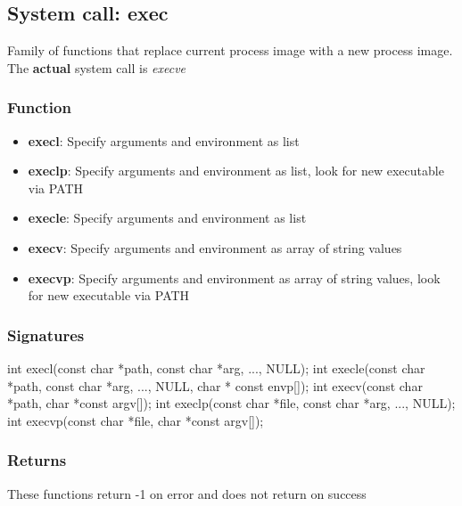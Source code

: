 \documentclass{report}
\begin{document}
        \bigbreak \noindent 
        \subsection{System call: exec}
        \bigbreak \noindent 
        \begin{concept}
            Family of functions that replace current process image with a new process image.
            \bigbreak \noindent 
            The \textbf{actual} system call is \textit{execve}
        \end{concept}

        \bigbreak \noindent 
        \subsubsection{Function}
        \begin{itemize}
            \item \textbf{execl}: Specify arguments and environment as list
            \item \textbf{execlp}: Specify arguments and environment as list, look for new executable via PATH
            \item \textbf{execle}: Specify arguments and environment as list
            \item \textbf{execv}: Specify arguments and environment as array of string values
            \item \textbf{execvp}: Specify arguments and environment as array of string values, look for new executable via PATH
        \end{itemize}


        \bigbreak \noindent 
        \subsubsection{Signatures}
        \bigbreak \noindent 
        \begin{cppcode}
            int execl(const char *path, const char *arg, ..., NULL);
            int execle(const char *path, const char *arg, ..., NULL, char * const envp[]);
            int execv(const char *path, char *const argv[]);
            int execlp(const char *file, const char *arg, ..., NULL);
            int execvp(const char *file, char *const argv[]);
        \end{cppcode}

        \bigbreak \noindent 
        \subsubsection{Returns}
        \bigbreak \noindent 
        These functions return -1 on error and does not return on success
        \bigbreak \noindent 
        
\end{document}
